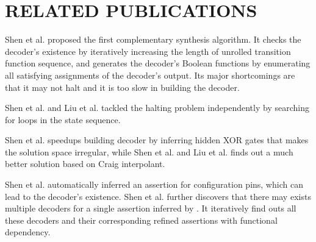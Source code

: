 \documentclass[conference]{IEEEtran}
\begin{document}
 















\section{RELATED PUBLICATIONS}\label{sec_relwork}
%
%

Shen et al.\cite{ShenICCAD09} proposed the first complementary synthesis algorithm.
It checks the decoder's existence by iteratively increasing the length of unrolled transition function sequence,
and generates the decoder's Boolean functions by enumerating all satisfying assignments of the decoder's output.
Its major shortcomings are that it may not halt and it is too slow
in building the decoder.

Shen et al.\cite{ShenTCAD11} and Liu et al.\cite{LiuICCAD11} tackled the halting problem independently by searching for loops in the state sequence.

Shen et al.\cite{ShenTCAD10} speedups building decoder by inferring hidden XOR gates that makes the solution space irregular,
while Shen et al.\cite{ShenTCAD12} and Liu et al. \cite{LiuICCAD11} 
finds out a much better solution based on Craig interpolant\cite{Craig}.

Shen et al.\cite{ShenICCAD11} automatically inferred an assertion for configuration pins, 
which can lead to the decoder's existence.
Shen et al.\cite{ShenTCAD12} further discovers that there may exists multiple decoders for a single assertion inferred by \cite{ShenICCAD11}.
It iteratively find outs all these decoders and their corresponding refined assertions with functional dependency\cite{scalableFuncDep}.
\end{document}
